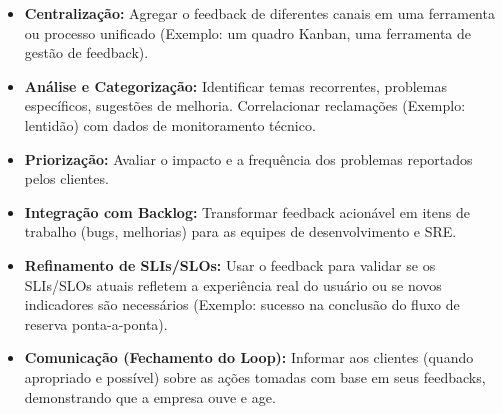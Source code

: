 \begin{itemize}
    \item \textbf{Centralização:} Agregar o feedback de diferentes canais em uma ferramenta ou processo unificado (Exemplo: um quadro Kanban, uma ferramenta de gestão de feedback).
    \item \textbf{Análise e Categorização:} Identificar temas recorrentes, problemas específicos, sugestões de melhoria. Correlacionar reclamações (Exemplo: lentidão) com dados de monitoramento técnico.
    \item \textbf{Priorização:} Avaliar o impacto e a frequência dos problemas reportados pelos clientes.
    \item \textbf{Integração com Backlog:} Transformar feedback acionável em itens de trabalho (bugs, melhorias) para as equipes de desenvolvimento e SRE.
    \item \textbf{Refinamento de SLIs/SLOs:} Usar o feedback para validar se os SLIs/SLOs atuais refletem a experiência real do usuário ou se novos indicadores são necessários (Exemplo: sucesso na conclusão do fluxo de reserva ponta-a-ponta).
    \item \textbf{Comunicação (Fechamento do Loop):} Informar aos clientes (quando apropriado e possível) sobre as ações tomadas com base em seus feedbacks, demonstrando que a empresa ouve e age.
\end{itemize}

